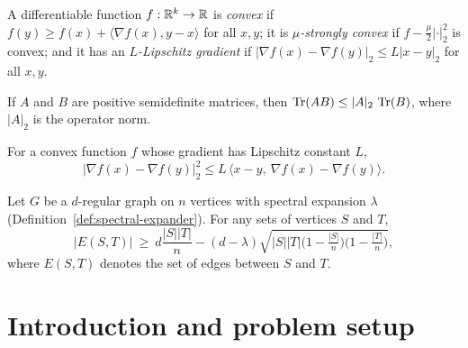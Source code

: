 \begin{definition}
  \label{def:convexity}
  \mathlibok
  A differentiable function $f : \mathbb{R}^k \to \mathbb{R}$ is \emph{convex} if
  $f(y) \ge f(x) + \langle \nabla f(x), y - x\rangle$ for all $x,y$; it is
  \emph{$\mu$-strongly convex} if $f - \tfrac{\mu}{2}|\cdot|_2^2$ is convex; and
  it has an \emph{$L$-Lipschitz gradient} if
  $|\nabla f(x) - \nabla f(y)|_2 \le L|x-y|_2$ for all $x,y$.
\end{definition}

\begin{lemma}
  \label{lem:trace-psd}
  \notready
  If $A$ and $B$ are positive semidefinite matrices, then
  $\operatorname{Tr}(AB) \le |A|_2 \,\operatorname{Tr}(B)$, where $|A|_2$ is the operator norm.
\end{lemma}

\begin{lemma}
  \label{lem:cocoercivity}
  \notready
  For a convex function $f$ whose gradient has Lipschitz constant $L$,
  \[
    |\nabla f(x) - \nabla f(y)|_2^2 \le L\,\langle x - y,\ \nabla f(x) - \nabla f(y)\rangle .
  \]
\end{lemma}

\begin{lemma}
  \label{lem:expander-mixing}
  \notready
  Let $G$ be a $d$-regular graph on $n$ vertices with spectral expansion
  $\lambda$ (Definition~\ref{def:spectral-expander}). For any sets of vertices
  $S$ and $T$,
  \[
    |E(S,T)| \ \ge\ d\frac{|S||T|}{n}
      - (d-\lambda)\sqrt{|S||T|\Big(1-\tfrac{|S|}{n}\Big)\Big(1-\tfrac{|T|}{n}\Big)} ,
  \]
  where $E(S,T)$ denotes the set of edges between $S$ and $T$.
\end{lemma}

\chapter{Introduction and problem setup}

